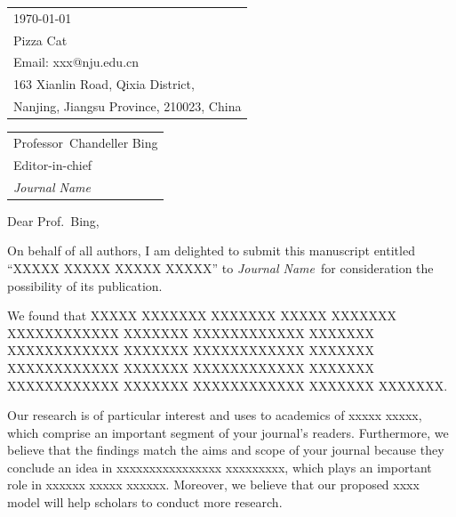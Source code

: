 \documentclass{article}
\newcommand{\journalname}{\textit{Journal Name}}
\begin{document}
\vspace*{30pt} %
\hfill
\begin{tabular}{l @{}}
\hfill \today \bigskip\\ %
\hfill Pizza Cat \\
\hfill Email: xxx@nju.edu.cn \\
\hfill 163 Xianlin Road, Qixia District,\\
\hfill Nanjing, Jiangsu Province, 210023, China \\ %
\end{tabular}

\bigskip %


\begin{tabular}{@{} l}
	Professor\ Chandeller Bing \\
	Editor-in-chief \\
    \journalname
\end{tabular}

\bigskip %

Dear Prof.\ Bing,

\bigskip %


On behalf of all authors, I am delighted to submit this manuscript entitled “XXXXX XXXXX XXXXX XXXXX” to \journalname\ for consideration the possibility of its publication.

We found that XXXXX XXXXXXX XXXXXXX XXXXX XXXXXXX XXXXXXXXXXXX XXXXXXX XXXXXXXXXXXX XXXXXXX XXXXXXXXXXXX XXXXXXX XXXXXXXXXXXX XXXXXXX XXXXXXXXXXXX XXXXXXX XXXXXXXXXXXX XXXXXXX XXXXXXXXXXXX XXXXXXX XXXXXXXXXXXX XXXXXXX XXXXXXX.
 
Our research is of particular interest and uses to academics of xxxxx xxxxx, which comprise an important segment of your journal's readers. Furthermore, we believe that the findings match the aims and scope of your journal because they conclude an idea in xxxxxxxxxxxxxxxx xxxxxxxxx, which plays an important role in xxxxxx xxxxx xxxxxx. Moreover, we believe that our proposed xxxx model will help scholars to conduct more research.
\end{document}
